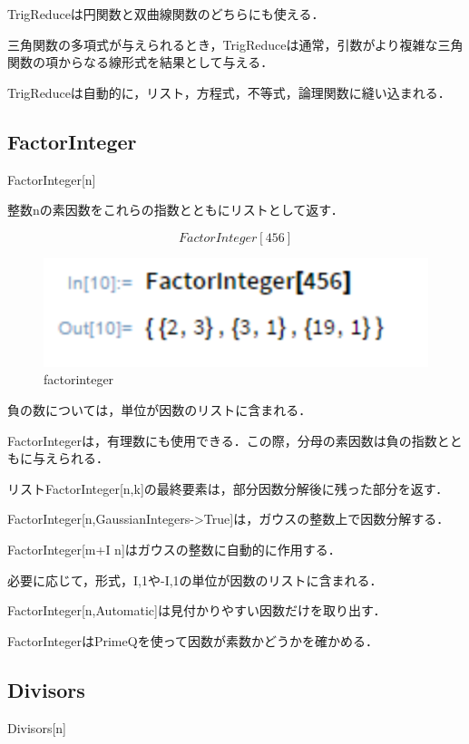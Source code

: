 TrigReduceは円関数と双曲線関数のどちらにも使える．

三角関数の多項式が与えられるとき，TrigReduceは通常，引数がより複雑な三角関数の項からなる線形式を結果として与える．

TrigReduceは自動的に，リスト，方程式，不等式，論理関数に縫い込まれる．


\subsection {FactorInteger}

FactorInteger[n]

整数nの素因数をこれらの指数とともにリストとして返す．

\[FactorInteger[456]\]

\begin{figure}[h]
\centering
\includegraphics[width=15cm]{factorinteger.png}
\caption{factorinteger}\label{図}
\end{figure}

負の数については，単位が因数のリストに含まれる．

FactorIntegerは，有理数にも使用できる．この際，分母の素因数は負の指数とともに与えられる． 

リストFactorInteger[n,k]の最終要素は，部分因数分解後に残った部分を返す．

FactorInteger[n,GaussianIntegers->True]は，ガウスの整数上で因数分解する． 

FactorInteger[m+I n]はガウスの整数に自動的に作用する．

必要に応じて，形式，{I,1}や{-I,1}の単位が因数のリストに含まれる．

FactorInteger[n,Automatic]は見付かりやすい因数だけを取り出す．

FactorIntegerはPrimeQを使って因数が素数かどうかを確かめる．

\clearpage

\subsection {Divisors}

Divisors[n]

